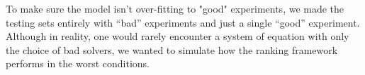 To make sure the model isn't over-fitting to "good" experiments, we made the testing sets entirely with ``bad'' experiments and just a single ``good'' experiment. Although in reality, one would rarely encounter a system of equation with only the choice of bad solvers, we wanted to simulate how the ranking framework performs in the worst conditions. 













